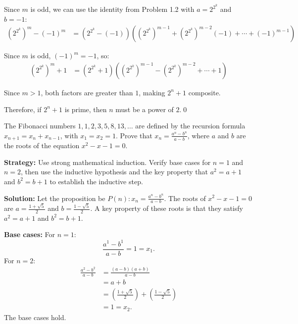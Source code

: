 Since $m$ is odd, we can use the identity from Problem 1.2 with $a = 2^{2^k}$ and $b = -1$:
\begin{align*}
(2^{2^k})^m - (-1)^m &= (2^{2^k} - (-1))((2^{2^k})^{m-1} + (2^{2^k})^{m-2}(-1) + \cdots + (-1)^{m-1})
\end{align*}

Since $m$ is odd, $(-1)^m = -1$, so:
\begin{align*}
(2^{2^k})^m + 1 &= (2^{2^k} + 1)((2^{2^k})^{m-1} - (2^{2^k})^{m-2} + \cdots + 1)
\end{align*}

Since $m > 1$, both factors are greater than $1$, making $2^n + 1$ composite.

Therefore, if $2^n + 1$ is prime, then $n$ must be a power of $2$.\qed



\begin{problembox}
The Fibonacci numbers $1, 1, 2, 3, 5, 8, 13, \dots$ are defined by the recursion formula $x_{n+1} = x_n + x_{n-1}$, with $x_1 = x_2 = 1$. Prove that $x_n = \frac{a^n - b^n}{a - b}$, where $a$ and $b$ are the roots of the equation $x^2 - x - 1 = 0$.
\end{problembox}

\noindent\textbf{Strategy:} Use strong mathematical induction. Verify base cases for $n=1$ and $n=2$, then use the inductive hypothesis and the key property that $a^2 = a+1$ and $b^2 = b+1$ to establish the inductive step.

\bigskip\noindent\textbf{Solution:}
Let the proposition be $P(n): x_n = \frac{a^n - b^n}{a-b}$. The roots of $x^2 - x - 1 = 0$ are $a = \frac{1+\sqrt{5}}{2}$ and $b = \frac{1-\sqrt{5}}{2}$.
A key property of these roots is that they satisfy $a^2 = a+1$ and $b^2 = b+1$.

\textbf{Base cases:}
For $n=1$:
\[ \frac{a^1 - b^1}{a-b} = 1 = x_1. \]
For $n=2$:
\begin{align*}
\frac{a^2 - b^2}{a-b} &= \frac{(a-b)(a+b)}{a-b}\\
&= a+b\\
&= \left(\frac{1+\sqrt{5}}{2}\right) + \left(\frac{1-\sqrt{5}}{2}\right)\\
&= 1 = x_2.
\end{align*}
The base cases hold.

